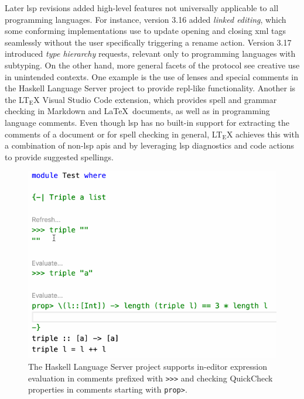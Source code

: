 Later \acrshort{lsp} revisions added high-level features not universally
applicable to all programming languages. For instance, version 3.16 added
\emph{linked editing}, which some conforming implementations use to update
opening and closing \acrshort{xml} tags seamlessly without the user specifically
triggering a rename action. Version 3.17 introduced \emph{type hierarchy}
requests, relevant only to programming languages with subtyping. On the other
hand, more general facets of the protocol see creative use in unintended
contexts. One example is the use of lenses and special comments in the Haskell
Language Server project\cite{haskell_ls} to provide \acrshort{repl}-like
functionality. Another is the LT$_\text{E}$X Visual Studio Code
extension\cite{vscode_spellcheck}, which provides spell and grammar checking in
Markdown and \LaTeX~documents, as well as in programming language comments. Even
though \acrshort{lsp} has no built-in support for extracting the comments of a
document or for spell checking in general, LT$_\text{E}$X achieves this with a
combination of non-\acrshort{lsp} \acrshort{api}s and by leveraging
\acrshort{lsp} diagnostics and code actions to provide suggested spellings.

\begin{figure}[h]\centering
	\includegraphics[height=0.3\textheight]{resources/code_haskell_repl.png}
	\caption{The Haskell Language Server project supports in-editor expression
	evaluation in comments prefixed with \texttt{>>>} and checking QuickCheck
	properties in comments starting with \texttt{prop>}.}
\end{figure}

